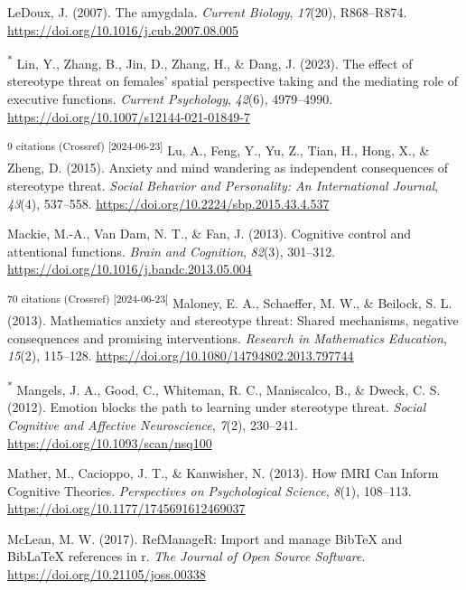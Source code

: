 \documentclass[
  stu, a4paper,floatsintext]{apa7}
\newlength{\cslhangindent}
\newenvironment{CSLReferences}[2] %
 {\begin{list}{}{%
  \setlength{\itemindent}{0pt}
  \setlength{\leftmargin}{0pt}
  \setlength{\parsep}{0pt}
  \ifodd #1
   \setlength{\leftmargin}{\cslhangindent}
   \setlength{\itemindent}{-1\cslhangindent}
  \fi
  \setlength{\itemsep}{#2\baselineskip}}}
 {\end{list}}
\begin{document}
\begin{CSLReferences}{1}{0}
LeDoux, J. (2007). The amygdala. \emph{Current Biology}, \emph{17}(20), R868--R874. \url{https://doi.org/10.1016/j.cub.2007.08.005}

\textsuperscript{*} Lin, Y., Zhang, B., Jin, D., Zhang, H., \& Dang, J. (2023). The effect of stereotype threat on females' spatial perspective taking and the mediating role of executive functions. \emph{Current Psychology}, \emph{42}(6), 4979--4990. \url{https://doi.org/10.1007/s12144-021-01849-7}

\textsuperscript{9 citations (Crossref) {[}2024-06-23{]}} Lu, A., Feng, Y., Yu, Z., Tian, H., Hong, X., \& Zheng, D. (2015). Anxiety and mind wandering as independent consequences of stereotype threat. \emph{Social Behavior and Personality: An International Journal}, \emph{43}(4), 537--558. \url{https://doi.org/10.2224/sbp.2015.43.4.537}

Mackie, M.-A., Van Dam, N. T., \& Fan, J. (2013). Cognitive control and attentional functions. \emph{Brain and Cognition}, \emph{82}(3), 301--312. \url{https://doi.org/10.1016/j.bandc.2013.05.004}

\textsuperscript{70 citations (Crossref) {[}2024-06-23{]}} Maloney, E. A., Schaeffer, M. W., \& Beilock, S. L. (2013). Mathematics anxiety and stereotype threat: Shared mechanisms, negative consequences and promising interventions. \emph{Research in Mathematics Education}, \emph{15}(2), 115--128. \url{https://doi.org/10.1080/14794802.2013.797744}

\textsuperscript{*} Mangels, J. A., Good, C., Whiteman, R. C., Maniscalco, B., \& Dweck, C. S. (2012). Emotion blocks the path to learning under stereotype threat. \emph{Social Cognitive and Affective Neuroscience}, \emph{7}(2), 230--241. \url{https://doi.org/10.1093/scan/nsq100}

Mather, M., Cacioppo, J. T., \& Kanwisher, N. (2013). How {fMRI Can Inform Cognitive Theories}. \emph{Perspectives on Psychological Science}, \emph{8}(1), 108--113. \url{https://doi.org/10.1177/1745691612469037}

McLean, M. W. (2017). RefManageR: Import and manage BibTeX and BibLaTeX references in r. \emph{The Journal of Open Source Software}. \url{https://doi.org/10.21105/joss.00338}


\end{CSLReferences}
\end{document}
